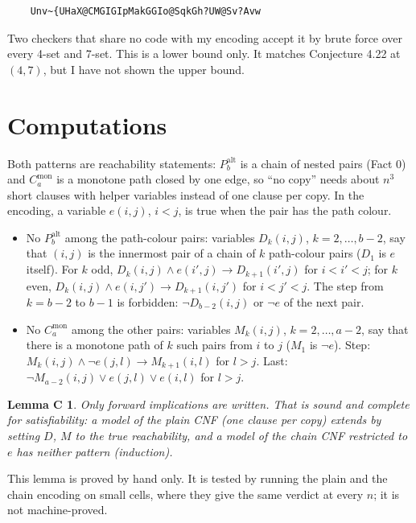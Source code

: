 \documentclass[11pt]{article}
\newcommand{\Cmon}[1]{C_{#1}^{\mathrm{mon}}}
\newcommand{\Palt}[1]{P_{#1}^{\mathrm{alt}}}
\theoremstyle{plain}
\newtheorem*{lemmaC}{Lemma C}
\theoremstyle{remark}
\begin{document}
\begin{verbatim}
    Unv~{UHaX@CMGIGIpMakGGIo@SqkGh?UW@Sv?Avw
\end{verbatim}

Two checkers that share no code with my encoding accept it by brute force over every 4-set and 7-set. This is a
lower bound only. It matches Conjecture 4.22 at $(4,7)$, but I have not shown the upper bound.

\section{Computations}\label{sec:comp}

Both patterns are reachability statements: $\Palt{b}$ is a chain of nested pairs (Fact 0) and $\Cmon{a}$ is a
monotone path closed by one edge, so ``no copy'' needs about $n^3$ short clauses with helper variables instead of
one clause per copy. In the encoding, a variable $e(i,j)$, $i < j$, is true when the pair has the path colour.

\begin{itemize}
  \item No $\Palt{b}$ among the path-colour pairs: variables $D_k(i,j)$, $k = 2, \dots, b-2$, say that $(i,j)$ is
  the innermost pair of a chain of $k$ path-colour pairs ($D_1$ is $e$ itself). For $k$ odd,
  $D_k(i,j) \wedge e(i',j) \to D_{k+1}(i',j)$ for $i < i' < j$; for $k$ even,
  $D_k(i,j) \wedge e(i,j') \to D_{k+1}(i,j')$ for $i < j' < j$. The step from $k = b-2$ to $b-1$ is forbidden:
  $\neg D_{b-2}(i,j)$ or $\neg e$ of the next pair.
  \item No $\Cmon{a}$ among the other pairs: variables $M_k(i,j)$, $k = 2, \dots, a-2$, say that there is a
  monotone path of $k$ such pairs from $i$ to $j$ ($M_1$ is $\neg e$). Step:
  $M_k(i,j) \wedge \neg e(j,l) \to M_{k+1}(i,l)$ for $l > j$. Last:
  $\neg M_{a-2}(i,j) \vee e(j,l) \vee e(i,l)$ for $l > j$.
\end{itemize}

\begin{lemmaC}
Only forward implications are written. That is sound and complete for satisfiability: a model of the plain CNF
(one clause per copy) extends by setting $D$, $M$ to the true reachability, and a model of the chain CNF restricted
to $e$ has neither pattern (induction).
\end{lemmaC}

This lemma is proved by hand only. It is tested by running the plain and the chain encoding on small cells, where
they give the same verdict at every $n$; it is not machine-proved.
\end{document}
